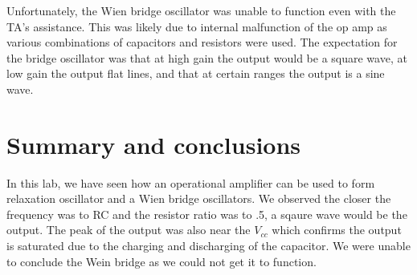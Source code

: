 \documentclass[11pt,letterpaper,onecolumn]{article}
\begin{document}
Unfortunately, the Wien bridge oscillator was unable to function even with the TA's assistance. This was likely due to internal malfunction of the op amp as various combinations of capacitors and resistors were used. The expectation for the bridge oscillator was that at high gain the output would be a square wave, at low gain the output flat lines, and that at certain ranges the output is a sine wave. 

\section{Summary and conclusions}

In this lab, we have seen how an operational amplifier can be used to form relaxation oscillator and a Wien bridge oscillators. We observed the closer the frequency was to RC and the resistor ratio was to .5, a sqaure wave would be the output. The peak of the output was also near the $V_{cc}$ which confirms the output is saturated due to the charging and discharging of the capacitor. We were unable to conclude the Wein bridge as we could not get it to function.  






\end{document}
